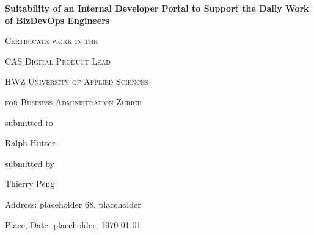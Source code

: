 \documentclass[a4paper,10pt]{article}
\begin{document}
    \begin{titlepage}
        \begin{center}
        {\huge\bfseries Suitability of an Internal Developer Portal to Support the Daily Work of BizDevOps Engineers\par}
            \vspace{2cm}

            {\scshape\large Certificate work in the \par}
            {\scshape\large CAS Digital Product Lead \par}
            \vspace{1cm}

            {\scshape\large HWZ University of Applied Sciences \par}
            {\scshape\large for Business Administration Zurich \par}
            \vspace{4cm}

            {\normalsize submitted to\par}
            \vspace{0.5cm}

            {\large Ralph Hutter\par}
            \vfill
            {\normalsize submitted by\par}
            \vspace{0.5cm}
            {\large Thierry Peng\par}
            \vspace{0.5cm}
            {\normalsize Address: placeholder 68, placeholder\par}
            {\normalsize  Place, Date: placeholder, \today\par}

        \end{center}
    \end{titlepage}
\end{document}
